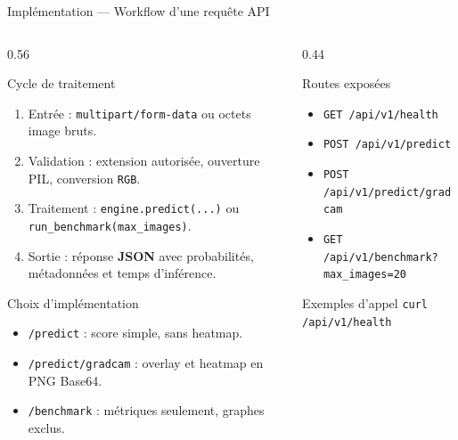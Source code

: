 \begin{frame}[t]{Implémentation — Workflow d'une requête API}
\vspace*{-0.18cm}
\begin{columns}[T,onlytextwidth]
\begin{column}{0.56\textwidth}
\scriptsize
\setlength{\abovedisplayskip}{3pt}
\setlength{\belowdisplayskip}{3pt}
\begin{block}{Cycle de traitement}
\begin{enumerate}
\setlength{\itemsep}{0.1em}
\item Entrée : \texttt{multipart/form-data} ou octets image bruts.
\item Validation : extension autorisée, ouverture PIL, conversion \texttt{RGB}.
\item Traitement : \texttt{engine.predict(...)} ou \texttt{run\_benchmark(max\_images)}.
\item Sortie : réponse \textbf{JSON} avec probabilités, métadonnées et temps d'inférence.
\end{enumerate}
\end{block}
\begin{block}{Choix d'implémentation}
\begin{itemize}
\setlength{\itemsep}{0.15em}
\item \texttt{/predict} : score simple, sans heatmap.
\item \texttt{/predict/gradcam} : overlay et heatmap en PNG Base64.
\item \texttt{/benchmark} : métriques seulement, graphes exclus.
\end{itemize}
\end{block}
\end{column}
\begin{column}{0.44\textwidth}
\scriptsize
\begin{block}{Routes exposées}
\begin{itemize}
\setlength{\itemsep}{0.1em}
\item \texttt{GET /api/v1/health}
\item \texttt{POST /api/v1/predict}
\item \texttt{POST /api/v1/predict/gradcam}
\item \texttt{GET /api/v1/benchmark?max\_images=20}
\end{itemize}
\end{block}
\begin{block}{Exemples d'appel}
\texttt{curl /api/v1/health}


\end{block}
\end{column}
\end{columns}
\end{frame}
